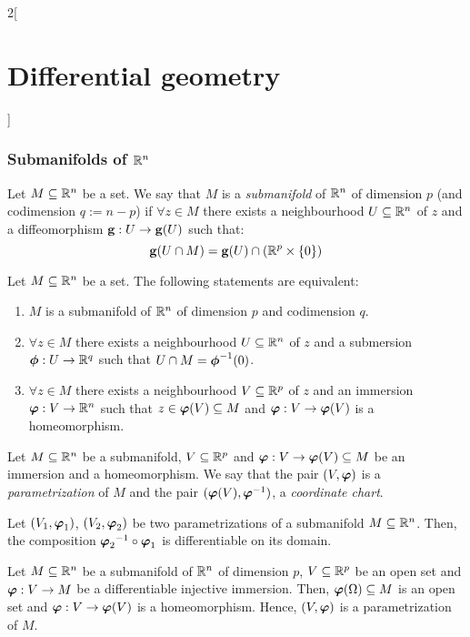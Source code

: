 \documentclass[../../../main.tex]{subfiles}
\begin{document}
\begin{multicols}{2}[\section{Differential geometry}]
  \subsubsection{Submanifolds of \texorpdfstring{$\mathbb{R}^n$}{Rn}}
  \begin{definition}
    Let $M\subseteq\mathbb{R}^n$ be a set. We say that $M$ is a \emph{submanifold} of $\mathbb{R}^n$ of dimension $p$ (and codimension $q:=n-p$) if $\forall z\in M$ there exists a neighbourhood $U\subseteq \mathbb{R}^n$ of $z$ and a diffeomorphism $\boldsymbol{\mathrm{g}}:U\rightarrow\boldsymbol{\mathrm{g}}(U)$ such that: $$\boldsymbol{\mathrm{g}}(U\cap M)=\boldsymbol{\mathrm{g}}(U)\cap\left(\mathbb{R}^p\times\{0\}\right)$$
  \end{definition}
  \begin{theorem}
    Let $M\subseteq\mathbb{R}^n$ be a set. The following statements are equivalent:
    \begin{enumerate}
      \item $M$ is a submanifold of $\mathbb{R}^n$ of dimension $p$ and codimension $q$.
      \item $\forall z\in M$ there exists a neighbourhood $U\subseteq \mathbb{R}^n$ of $z$ and a submersion $\boldsymbol{\mathrm{\phi}}:U\rightarrow\mathbb{R}^q$ such that $U\cap M={\boldsymbol{\mathrm{\phi}}}^{-1}(0)$.
      \item $\forall z\in M$ there exists a neighbourhood $V\subseteq \mathbb{R}^p$ of $z$ and an immersion $\boldsymbol{\mathrm{\varphi}}:V\rightarrow\mathbb{R}^n$ such that $z\in\boldsymbol{\mathrm{\varphi}}(V)\subseteq M$ and $\boldsymbol{\mathrm{\varphi}}:V\rightarrow\boldsymbol{\mathrm{\varphi}}(V)$ is a homeomorphism.
    \end{enumerate}
  \end{theorem}
  \begin{definition}
    Let $M\subseteq\mathbb{R}^n$ be a submanifold, $V\subseteq \mathbb{R}^p$ and $\boldsymbol{\mathrm{\varphi}}:V\rightarrow\boldsymbol{\mathrm{\varphi}}(V)\subseteq M$ be an immersion and a homeomorphism. We say that the pair $(V,\boldsymbol{\mathrm{\varphi}})$ is a \emph{parametrization} of $M$ and the pair $(\boldsymbol{\mathrm{\varphi}}(V),{\boldsymbol{\mathrm{\varphi}}}^{-1})$, a \emph{coordinate chart}.
  \end{definition}
  \begin{proposition}
    Let $(V_1,\boldsymbol{\mathrm{\varphi}}_1)$, $(V_2,\boldsymbol{\mathrm{\varphi}}_2)$ be two parametrizations of a submanifold $M\subseteq\mathbb{R}^n$. Then, the composition ${\boldsymbol{\mathrm{\varphi}}_2}^{-1}\circ\boldsymbol{\mathrm{\varphi}}_1$ is differentiable on its domain.
  \end{proposition}
  \begin{proposition}
    Let $M\subseteq\mathbb{R}^n$ be a submanifold of $\mathbb{R}^n$ of dimension $p$, $V\subseteq\mathbb{R}^p$ be an open set and $\boldsymbol{\mathrm{\varphi}}:V\rightarrow M$ be a differentiable injective immersion. Then, $\boldsymbol{\mathrm{\varphi}}(\Omega)\subseteq M$ is an open set and $\boldsymbol{\mathrm{\varphi}}:V\rightarrow \boldsymbol{\mathrm{\varphi}}(V)$ is a homeomorphism. Hence, $(V,\boldsymbol{\mathrm{\varphi}})$ is a parametrization of $M$.
  \end{proposition}

\end{multicols}
\end{document}
